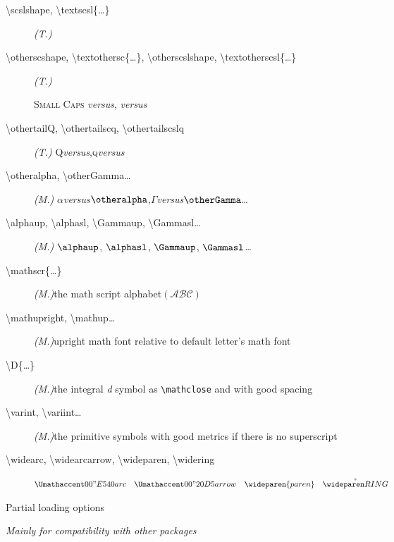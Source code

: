 \documentclass[a4paper,11pt]{article}
\newcommand{\versus}{\;\textit{versus}\;}
\begin{document}
\begin{description}
  \item[\textbackslash scslshape, \textbackslash textscsl\{\dots\}]\textit{(T.)}\quad {}
  \item[\textbackslash otherscshape, \textbackslash textothersc\{\dots\}, \textbackslash otherscslshape, \textbackslash textotherscsl\{\dots\}]\textit{(T.)}\quad 
  
       \textsc{Small Caps} \versus{}, \qquad
        \versus{}
  \item[\textbackslash othertailQ, \textbackslash othertailscq, \textbackslash othertailscslq]\textit{(T.)}\quad
       Q\versus\othertailQ\quad,\quad \textsc{q}\versus\othertailscq
  \item[\textbackslash otheralpha, \textbackslash otherGamma\dots]\textit{(M.)}\quad
       $\alpha$\versus$\otheralpha$,\quad$\Gamma$\versus$\otherGamma$\dots
  \item[\textbackslash alphaup, \textbackslash alphasl, 
       \textbackslash Gammaup, \textbackslash Gammasl\dots]\textit{(M.)}\quad
       $\alphaup$, $\alphasl$, $\Gammaup$, $\Gammasl$\dots
  \item[\textbackslash mathscr\{\dots\}]\textit{(M.)}\quad the math script alphabet\quad $(\mathscr{ABC})$
  \item[\textbackslash mathupright, \textbackslash mathup\dots]\textit{(M.)}\quad upright math font relative to default letter's math font
  \item[\textbackslash D\{\dots\}]\textit{(M.)}\quad the integral \textit{d} symbol as \verb=\mathclose= 
       and with good spacing
  \item[\textbackslash varint, \textbackslash variint\dots]\textit{(M.)}\quad the primitive symbols with good metrics 
       if there is no superscript
  \item[\textbackslash widearc, \textbackslash widearcarrow, \textbackslash wideparen,
       \textbackslash widering]\quad $\widearc{arc}\quad\widearcarrow{arrow}\quad\wideparen{paren}\quad\widering{RING}$
\end{description}

\vfill

\begin{center}
\textsf{\Large Partial loading options}
\end{center}

\begin{center}
\textit{\small Mainly for compatibility with other packages}
\end{center}
\end{document}
